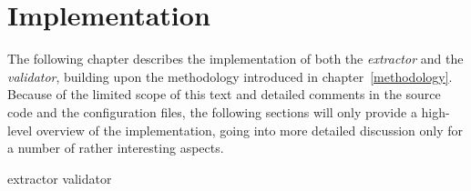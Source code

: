 \chapter{Implementation}
\label{implementation}

The following chapter describes the implementation of both the \textit{extractor} and the \textit{validator}, building upon the methodology introduced in chapter~\ref{methodology}. Because of the limited scope of this text and detailed comments in the source code and the configuration files, the following sections will only provide a high-level overview of the implementation, going into more detailed discussion only for a number of rather interesting aspects.

{extractor}
{validator}